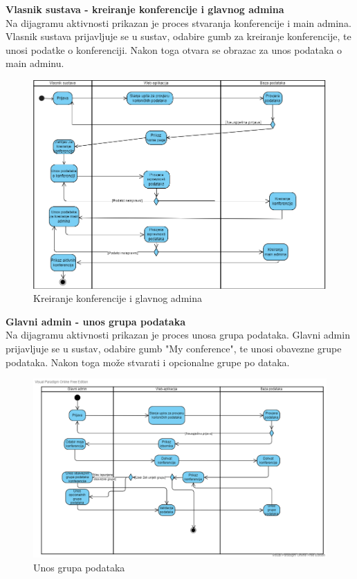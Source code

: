 			\textbf{Vlasnik sustava - kreiranje konferencije i glavnog admina}\\

		   \text Na dijagramu aktivnosti prikazan je proces stvaranja konferencije i main admina. Vlasnik sustava prijavljuje se u sustav, odabire gumb za kreiranje konferencije, te unosi podatke o konferenciji. Nakon toga otvara se obrazac za unos podataka o main adminu.


		   \begin{figure}[H]
		   \includegraphics[scale=0.65]{slike/Dijagram aktivnosti - system owner.png} %
		   
		   \centering
		   \caption{Kreiranje konferencije i glavnog admina}
		   \label{fig:dijagram_aktivnosti_vlasnik_sustava}
		   \end{figure}

  \textbf{Glavni admin - unos grupa podataka}\\

		   \text Na dijagramu aktivnosti prikazan je proces unosa grupa podataka. Glavni admin prijavljuje se u sustav, odabire gumb "My conference", te unosi obavezne grupe podataka. Nakon toga može stvarati i opcionalne grupe po dataka. 


		   \begin{figure}[H]
		   \includegraphics[scale=0.45]{slike/Main admin - unos grupa podataka.png} %
		   
		   \centering
		   \caption{Unos grupa podataka}
		   \label{fig:dijagram_aktivnosti_glavni_admin}
		   \end{figure}

